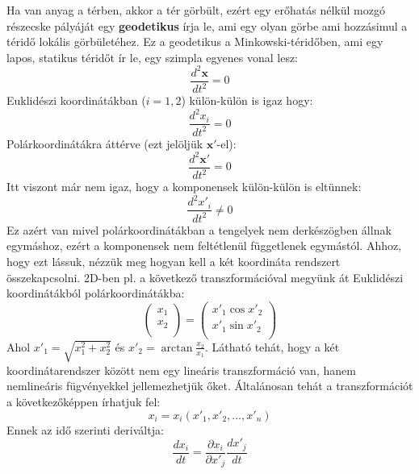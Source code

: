 \documentclass[../main.tex]{subfiles}
\begin{document}
Ha van anyag a térben, akkor a tér görbült, ezért egy erőhatás nélkül mozgó részecske pályáját egy \textbf{geodetikus} írja le, ami egy olyan görbe ami hozzásimul a téridő lokális görbületéhez.
Ez a geodetikus a Minkowski-téridőben, ami egy lapos, statikus téridőt ír le, egy szimpla egyenes vonal lesz:
\begin{equation}
    \frac{d^2 \mathbf{x}}{d t^2} = 0
\end{equation}
Euklidészi koordinátákban ($i = 1,2$) külön-külön is igaz hogy:
\begin{equation}
    \frac{d^2 x_i}{d t^2} = 0
\end{equation}
Polárkoordinátákra áttérve (ezt jelöljük $\mathbf{x}'$-el):
\begin{equation}
    \frac{d^2 \mathbf{x}'}{d t^2} = 0
\end{equation}
Itt viszont már nem igaz, hogy a komponensek külön-külön is eltünnek:
\begin{equation}
    \frac{d^2 x'_i}{d t^2} \neq 0
\end{equation}
Ez azért van mivel polárkoordinátákban a tengelyek nem derkészögben állnak egymáshoz, ezért a komponensek nem feltétlenül függetlenek egymástól. Ahhoz, hogy ezt lássuk, nézzük meg hogyan kell a két 
koordináta rendszert összekapcsolni. 2D-ben pl. a következő transzformációval megyünk át Euklidészi koordinátákból polárkoordinátákba:
\begin{equation}
    \begin{pmatrix}
        x_{1} \\
        x_{2} \\
    \end{pmatrix} = \begin{pmatrix}
        x'_1 \cos x'_2 \\
        x'_1 \sin x'_2 \\
    \end{pmatrix}    
\end{equation}
Ahol $x'_1 = \sqrt{x_1^2 + x_2^2}$ és $x'_2 = \arctan{\frac{x_2}{x_1}}$. Látható tehát, hogy a két koordinátarendszer között nem egy lineáris transzformáció van, hanem  nemlineáris fügvényekkel jellemezhetjük őket.
Általánosan tehát a transzformációt a következőképpen írhatjuk fel:
\begin{equation}
    x_i = x_i(x'_1, x'_2, \ldots, x'_n)
\end{equation}
Ennek az idő szerinti deriváltja:
\begin{equation}
    \frac{d x_i}{d t} = \frac{\partial x_i}{\partial x'_j} \frac{d x'_j}{d t}
\end{equation}
\end{document}

